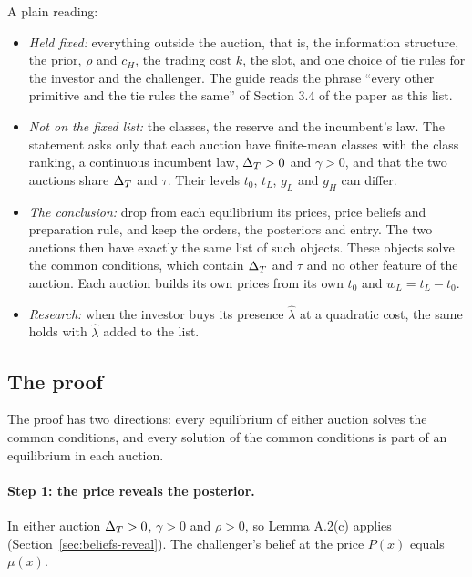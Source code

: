 A plain reading:
\begin{itemize}
\item \emph{Held fixed:} everything outside the auction, that is, the information structure, the prior, \(\rho\)
and \(c_H\), the trading cost \(k\), the slot, and one choice of tie rules for the investor and the challenger.
The guide reads the phrase ``every other primitive and the tie rules the same'' of Section 3.4 of the paper as
this list.
\item \emph{Not on the fixed list:} the classes, the reserve and the incumbent's law. The statement asks only that
each auction have finite-mean classes with the class ranking, a continuous incumbent law, \(\Delta_T>0\) and
\(\gamma>0\), and that the two auctions share \(\Delta_T\) and \(\tau\). Their levels \(t_0\), \(t_L\), \(g_L\) and
\(g_H\) can differ.
\item \emph{The conclusion:} drop from each equilibrium its prices, price beliefs and preparation rule, and keep
the orders, the posteriors and entry. The two auctions then have exactly the same list of such objects. These
objects solve the common conditions, which contain \(\Delta_T\) and \(\tau\) and no other feature of the auction. Each
auction builds its own prices from its own \(t_0\) and \(w_L=t_L-t_0\).
\item \emph{Research:} when the investor buys its presence \(\hat\lambda\) at a quadratic cost, the same holds with
\(\hat\lambda\) added to the list.
\end{itemize}

\subsection{The proof}

The proof has two directions: every equilibrium of either auction solves the common conditions, and every solution
of the common conditions is part of an equilibrium in each auction.

\paragraph{Step 1: the price reveals the posterior.} In either auction \(\Delta_T>0\), \(\gamma>0\) and \(\rho>0\), so
Lemma A.2(c) applies (Section~\ref{sec:beliefs-reveal}). The challenger's belief at the price \(P(x)\) equals
\(\mu(x)\).

